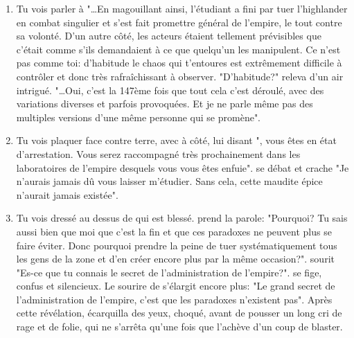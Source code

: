 {\begin{enumerate}
		\item Tu vois \nmPlayerIV parler à \nmPlayerXI "\dots En magouillant ainsi, l'étudiant a fini par tuer l'highlander en combat singulier et s'est fait promettre général de l'empire, le tout contre sa volonté. D'un autre côté, les acteurs étaient tellement prévisibles que c'était comme s'ils demandaient à ce que quelqu'un les manipulent. Ce n'est pas comme toi: d'habitude le chaos qui t'entoures est extrêmement difficile à contrôler et donc très rafraîchissant à observer. "D'habitude?" releva \nmPlayerXI d'un air intrigué. "\dots Oui, c'est la 147ème fois que tout cela c'est déroulé, avec des variations diverses et parfois provoquées. Et je ne parle même pas des multiples versions d'une même personne qui se promène".
		
		
		\item Tu vois \nmPlayerVII plaquer \nmPlayerIX face contre terre, avec \nmPlayerXII à côté, lui disant "\nmPlayerIX, vous êtes en état d'arrestation. Vous serez raccompagné très prochainement dans les laboratoires de l'empire desquels vous vous êtes enfuie". \nmPlayerIX se débat et crache "Je n'aurais jamais dû vous laisser m'étudier. Sans cela, cette maudite épice n'aurait jamais existée".
		
		\item Tu vois \nmPlayerXII dressé au dessus de \nmPlayerVII qui est blessé. \nmPlayerVII prend la parole: "Pourquoi? Tu sais aussi bien que moi que c'est la fin et que ces paradoxes ne peuvent plus se faire éviter. Donc pourquoi prendre la peine de tuer systématiquement tous les gens de la zone et d'en créer encore plus par la même occasion?". \nmPlayerXII sourit "Es-ce que tu connais le secret de l'administration de l'empire?". \nmPlayerVII se fige, confus et silencieux.	Le sourire de \nmPlayerXII s'élargit encore plus: "Le grand secret de l'administration de l'empire, c'est que les paradoxes n'existent pas". Après cette révélation, \nmPlayerVII écarquilla des yeux, choqué, avant de pousser un long cri de rage et de folie, qui ne s'arrêta qu'une fois que \nmPlayerXII l'achève d'un coup de blaster.
		

\end{enumerate}}
